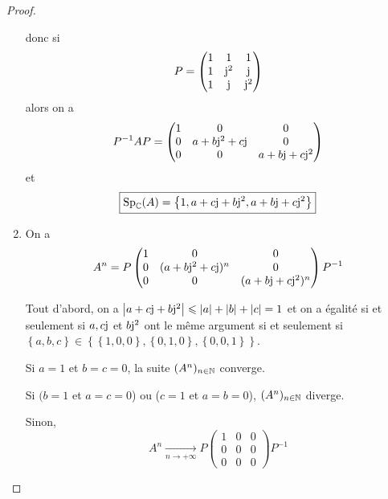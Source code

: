 \documentclass[12pt]{article}
\begin{document}
\begin{proof}
\begin{enumerate}
		donc si 
		\begin{equation}
			P=\begin{pmatrix}
				1&1&1\\ 1&\mathrm{j}^{2}&\mathrm{j}\\1&\mathrm{j}&\mathrm{j}^{2}
			\end{pmatrix}
		\end{equation}
		alors on a 
		\begin{equation}
			P^{-1}AP=\begin{pmatrix}
				1&0&0\\
				0&a+b\mathrm{j}^{2}+c\mathrm{j}&0\\
				0&0&a+b\mathrm{j}+c\mathrm{j}^{2}
			\end{pmatrix}
		\end{equation}
		et 
		\begin{equation}
			\boxed{
				\operatorname{Sp}_{\mathbb{C}}(A)=\left\lbrace1,a+c\mathrm{j}+b\mathrm{j}^{2},a+b\mathrm{j}+c\mathrm{j}^{2}\right\rbrace
			}
		\end{equation}

		\item On a 
		\begin{equation}
			A^{n}=P\begin{pmatrix}
				1&0&0\\
				0&(a+b\mathrm{j}^{2}+c\mathrm{j})^{n}&0\\
				0&0&(a+b\mathrm{j}+c\mathrm{j}^{2})^{n}
			\end{pmatrix}P^{-1}
		\end{equation}

		Tout d'abord, on a $\left\lvert a+c\mathrm{j}+b\mathrm{j}^{2}\right\rvert\leqslant\left\lvert a\right\rvert+\left\lvert b\right\rvert+\left\lvert c\right\rvert=1$ et on a égalité si et seulement si $a,c\mathrm{j}$ et $b\mathrm{j}^{2}$ ont le même argument si et seulement si $\left\lbrace a,b,c\right\rbrace\in\left\lbrace\left\lbrace1,0,0\right\rbrace,\left\lbrace0,1,0\right\rbrace,\left\lbrace0,0,1\right\rbrace\right\rbrace$.

		Si $a=1$ et $b=c=0$, la suite $(A^{n})_{n\in\mathbb{N}}$ converge.

		Si $(b=1$ et $a=c=0$) ou ($c=1$ et $a=b=0$), $(A^{n})_{n\in\mathbb{N}}$ diverge.

		Sinon,
		\begin{equation}
			\boxed{
			A^{n}\xrightarrow[n\to+\infty]{}P\begin{pmatrix}
				1&0&0\\0&0&0\\0&0&0
			\end{pmatrix}P^{-1}}
		\end{equation}
	\end{enumerate}
\end{proof}
\end{document}
